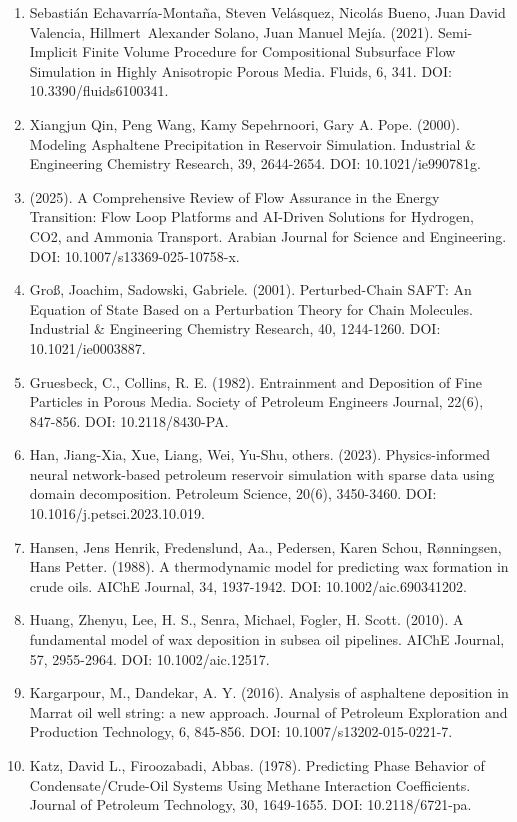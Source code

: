 \documentclass[11pt]{extarticle}
\begin{document}
\begin{enumerate}
\item
  Sebastián Echavarría-Montaña, Steven Velásquez, Nicolás Bueno, Juan David Valencia, Hillmert~Alexander Solano, Juan Manuel Mejía. (2021). Semi-Implicit Finite Volume Procedure for Compositional Subsurface Flow Simulation in Highly Anisotropic Porous Media. Fluids, 6, 341. DOI: 10.3390/fluids6100341.
\item
  Xiangjun Qin, Peng Wang, Kamy Sepehrnoori, Gary A. Pope. (2000). Modeling Asphaltene Precipitation in Reservoir Simulation. Industrial \& Engineering Chemistry Research, 39, 2644-2654. DOI: 10.1021/ie990781g.
\item
  (2025). A Comprehensive Review of Flow Assurance in the Energy Transition: Flow Loop Platforms and AI-Driven Solutions for Hydrogen, CO2, and Ammonia Transport. Arabian Journal for Science and Engineering. DOI: 10.1007/s13369-025-10758-x.
\item
  Groß, Joachim, Sadowski, Gabriele. (2001). Perturbed-Chain SAFT: An Equation of State Based on a Perturbation Theory for Chain Molecules. Industrial \& Engineering Chemistry Research, 40, 1244-1260. DOI: 10.1021/ie0003887.
\item
  Gruesbeck, C., Collins, R. E. (1982). Entrainment and Deposition of Fine Particles in Porous Media. Society of Petroleum Engineers Journal, 22(6), 847-856. DOI: 10.2118/8430-PA.
\item
  Han, Jiang-Xia, Xue, Liang, Wei, Yu-Shu, others. (2023). Physics-informed neural network-based petroleum reservoir simulation with sparse data using domain decomposition. Petroleum Science, 20(6), 3450-3460. DOI: 10.1016/j.petsci.2023.10.019.
\item
  Hansen, Jens Henrik, Fredenslund, Aa., Pedersen, Karen Schou, Rønningsen, Hans Petter. (1988). A thermodynamic model for predicting wax formation in crude oils. AIChE Journal, 34, 1937-1942. DOI: 10.1002/aic.690341202.
\item
  Huang, Zhenyu, Lee, H. S., Senra, Michael, Fogler, H. Scott. (2010). A fundamental model of wax deposition in subsea oil pipelines. AIChE Journal, 57, 2955-2964. DOI: 10.1002/aic.12517.
\item
  Kargarpour, M., Dandekar, A. Y. (2016). Analysis of asphaltene deposition in Marrat oil well string: a new approach. Journal of Petroleum Exploration and Production Technology, 6, 845-856. DOI: 10.1007/s13202-015-0221-7.
\item
  Katz, David L., Firoozabadi, Abbas. (1978). Predicting Phase Behavior of Condensate/Crude-Oil Systems Using Methane Interaction Coefficients. Journal of Petroleum Technology, 30, 1649-1655. DOI: 10.2118/6721-pa.

\end{enumerate}
\end{document}
